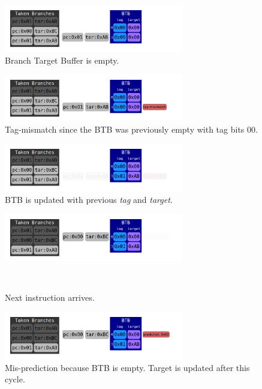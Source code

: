 \documentclass[12pt]{article}
\newenvironment{QandA}{\begin{enumerate}[label=\bfseries\arabic*.]\bfseries}
                      {\end{enumerate}}
\newenvironment{answered}{\par\quad\normalfont}{}
\begin{document}
\begin{QandA}
\begin{answered}
\begin{figure}[!ht]
\centering
\includegraphics[width=0.7\textwidth]{chapter7_imgs/btb/btb000.png}
\caption{Branch Target Buffer is empty.}
\label{btb001}
\end{figure}

\begin{figure}[!ht]
\centering
\includegraphics[width=0.7\textwidth]{chapter7_imgs/btb/btb001.png}
\caption{Tag-mismatch since the BTB was previously empty with tag bits $00$.}
\label{btb002}
\end{figure}

\begin{figure}[!ht]
\centering
\includegraphics[width=0.7\textwidth]{chapter7_imgs/btb/btb002.png}
\caption{BTB is updated with previous \textit{tag} and \textit{target}.}
\label{btb003}
\end{figure}

\begin{figure}[!ht]
\centering
\includegraphics[width=0.7\textwidth]{chapter7_imgs/btb/btb003.png}
\caption{Next instruction arrives.}\
\label{btb004}
\end{figure}

\begin{figure}[!ht]
\centering
\includegraphics[width=0.7\textwidth]{chapter7_imgs/btb/btb004.png}
\caption{Mis-prediction because BTB is empty. Target is updated after this cycle.}
\label{btb005}
\end{figure}


\end{answered}
\end{QandA}
\end{document}
